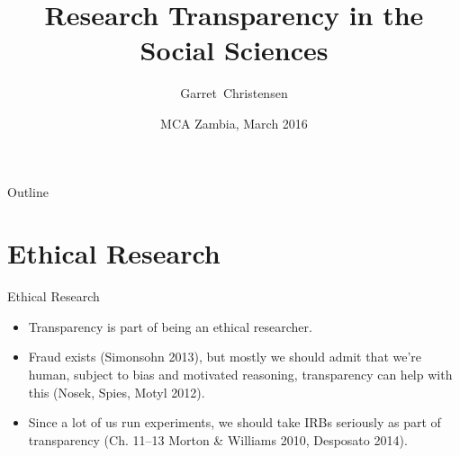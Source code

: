 \documentclass{beamer}
\title[Research Transparency in the Social Sciences] %
{Research Transparency in the Social Sciences}
\subtitle
{}
\author[Christensen] %
{Garret~Christensen\inst{1,2}}
\institute[Universities of Somewhere and Elsewhere] %
{
  \inst{1}%
  Berkeley Initiative for Transparency in the Social Sciences\\
  UC Berkeley
  \and
  \inst{2}%
  Berkeley Institute for Data Science\\
  }
\date[BITSS2014] %
{MCA Zambia, March 2016}
\begin{document}
\begin{frame}
  \titlepage
\end{frame}






\begin{frame}{Outline}
  \tableofcontents
\end{frame}
\section{Ethical Research}
\begin{frame}{Ethical Research}
\begin{itemize}
\item
Transparency is part of being an ethical researcher. 
\item
Fraud exists (Simonsohn 2013), but mostly we should admit that we're human, subject to bias and motivated reasoning, transparency can help with this (Nosek, Spies, Motyl 2012).
\item
Since a lot of us run experiments, we should take IRBs seriously as part of transparency (Ch. 11--13 Morton \& Williams 2010, Desposato 2014). 
\end{itemize}
\end{frame}

\end{document}
